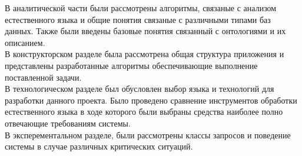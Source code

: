\Conclusion %
В аналитической части были рассмотрены алгоритмы, связаные с анализом естественного языка и общие понятия связаные с различными типами баз данных. Также были введены базовые понятия связанный с онтологиями и их описанием.\\
В конструкторском разделе была рассмотрена общая структура приложения и представлены разработанные алгоритмы обеспечивающие выполнение поставленной задачи.\\
В технологическом разделе был обусловлен выбор языка и технологий для разработки данного проекта. Было проведено сравнение инструментов обработки естественного языка в ходе которого были выбраны средства наиболее полно отвечающие требованиям системы.
\\
В эксперементальном разделе, были рассмотрены классы запросов и поведение системы в случае различных критических ситуаций.
